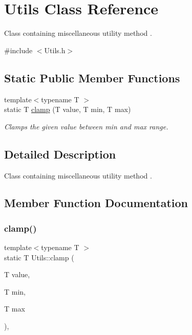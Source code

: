 \hypertarget{class_utils}{}\section{Utils Class Reference}
\label{class_utils}


Class containing miscellaneous utility method .  




{\ttfamily \#include $<$Utils.\+h$>$}

\subsection*{Static Public Member Functions}
\begin{DoxyCompactItemize}
\item 
{\footnotesize template$<$typename T $>$ }\\static T \mbox{\hyperlink{class_utils_a8aad8ee819e3987210a9cd70f2127329}{clamp}} (T value, T min, T max)
\begin{DoxyCompactList}\small\item\em Clamps the given value between min and max range. \end{DoxyCompactList}\end{DoxyCompactItemize}


\subsection{Detailed Description}
Class containing miscellaneous utility method . 



\subsection{Member Function Documentation}
\mbox{\label{class_utils_a8aad8ee819e3987210a9cd70f2127329}} 
\subsubsection{\texorpdfstring{clamp()}{clamp()}}
{\footnotesize\ttfamily template$<$typename T $>$ \\
static T Utils\+::clamp (\begin{DoxyParamCaption}\item[{T}]{value,  }\item[{T}]{min,  }\item[{T}]{max }\end{DoxyParamCaption})\hspace{0.3cm}{\ttfamily [inline]}, {\ttfamily [static]}}



